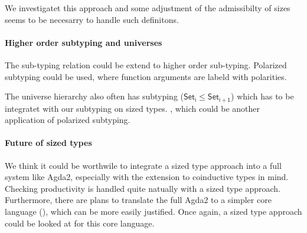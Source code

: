 We investigatet this approach and some adjustment of the admissibilty of sizes seems to be necesarry to handle such definitons.
\paragraph*{Higher order subtyping and universes }
The sub-typing relation could be extend to higher order sub-typing.
Polarized subtyping \cite{steffen} could be used, where function arguments are labeld with polarities. 

The universe hierarchy also often has subtyping ($ \mathsf{Set_i} \leq \mathsf{Set_{i+1}}$) which has to be integratet with our subtyping on sized types.
, which could be another application of polarized subtyping.
\paragraph*{Future of sized types}
We think it could be worthwile to integrate a sized type approach into a full system like Agda2, especially with the extension to coinductive types in mind. Checking productivity is handled quite natually with a sized type approach. 
Furthermore, there are plans to translate the full Agda2 to a simpler core language (\cite{mini-tt}), which can be more easily justified. Once again, a sized type approach could be looked at for this core language.

